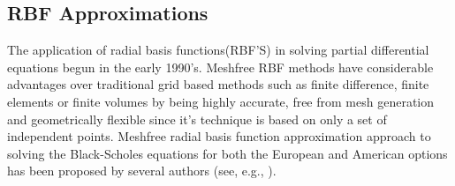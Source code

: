 \documentclass[12pt]{article}
\numberwithin{equation}{subsection} %
\newcommand{\sect}[1]{%
\cleardoublepage
\clearpage
\newpage
\begin{center}
\addtocounter{section} {1}
\setcounter{subsection} {0}
\section* {\normalsize \bf{CHAPTER \thesection \\ #1}}
\addcontentsline{toc}{section}{CHAPTER
\protect\numberline{\thesection : } #1\dotfill}
\end{center}
\thispagestyle{myheadings} }
\begin{document}
%
%

\subsection{ RBF Approximations}
The application of radial basis functions(RBF'S) in solving partial
differential equations begun in the early 1990's\cite{NB11}.
Meshfree RBF methods have  considerable advantages over traditional
grid based methods such as finite difference, finite elements or
finite volumes by being highly accurate, free from mesh generation
and geometrically flexible since it's technique is based on only a
set of independent points.
 Meshfree radial basis function approximation approach to  solving the Black-Scholes
equations for both the  European and American options has been
proposed by several authors (see, e.g.,
\cite{YZE07,Hon09,UEG,Fas02}).
\end{document}
